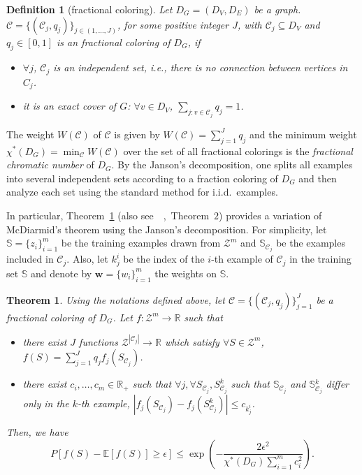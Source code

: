 \documentclass[letterpaper]{article} %
\newtheorem{theorem}{Theorem}
\newtheorem{definition}{Definition}
\newcommand{\E}{\mathbb{E}}
\newcommand{\Pro}{P}
\newcommand{\weight}{\mathbf{w}}
\newcommand{\real}{\mathbb{R}}
\newcommand{\zspace}{\mathcal{Z}}
\newcommand{\fcoloring}{\chi^*}
\newcommand{\set}[1]{\{#1\}}
\newcommand{\trainingset}{\mathbb{S}}
\newcommand{\citep}[3]{(#1\ \citeauthor{#3}\ \citeyear{#3},\ #2)}
\begin{document}
\begin{definition}[fractional coloring]
  Let $D_G=(D_V,D_E)$ be a graph. $\mathcal{C}=\set{(\mathcal{C}_j,q_j)}_{j\in (1,\dots,J)}$, for some positive integer $J$, with $\mathcal{C}_j\subseteq D_V$ and $q_j\in [0,1]$ is an fractional coloring of $D_G$, if
  \begin{itemize}
    \item $\forall j$, $\mathcal{C}_j$ is an independent set, i.e., there is no connection between vertices in $C_j$.
    \item it is an exact cover of $G$: $\forall v \in D_V$, $\sum_{j: v\in \mathcal{C}_j} q_j = 1$.
  \end{itemize}
\end{definition}
The weight $W(\mathcal{C})$ of $\mathcal{C}$ is given by $W(\mathcal{C})=\sum_{j=1}^J q_j$ and the minimum weight $\fcoloring{}(D_G)=\min_{\mathcal{C}} W(\mathcal{C})$ over the set of all fractional colorings is the \emph{fractional chromatic number} of $D_G$.
By the Janson's decomposition, one splits all examples into several independent sets according to a fraction coloring of $D_G$ and then analyze each set using the standard method for i.i.d.\ examples.

In particular, Theorem~\ref{th:fractional_mcdiarmid} \citep{also see}{Theorem~$2$}{Usunier2005} provides a variation of McDiarmid's theorem using the Janson's decomposition.
For simplicity, let $\trainingset=\set{z_i}_{i=1}^{m}$ be the training examples drawn from $\zspace^m$ and $\trainingset{}_{\mathcal{C}_j}$ be the examples included in $\mathcal{C}_j$.
Also, let $k_j^i$ be the index of the $i$-th example of $\mathcal{C}_j$ in the training set $\trainingset{}$ and denote by $\weight{}=\set{w_i}_{i=1}^m$ the weights on $\trainingset{}$.

\begin{theorem}
   \label{th:fractional_mcdiarmid}
   Using the notations defined above, let $\mathcal{C} = \set{(\mathcal{C}_j, q_j)}_{j=1}^J$ be a fractional coloring of $D_G$. Let $f:\zspace^m \to \real{}$ such that
   \begin{itemize}
     \item there exist $J$ functions $\zspace^{|\mathcal{C}_j|} \to \real{}$ which satisfy $\forall S\in \zspace^m$, $f(S)=\sum_{j=1}^J q_j f_j(S_{\mathcal{C}_j})$.
     \item there exist $c_i,\dots,c_m\in \real{}_+$ such that $\forall j,\forall S_{\mathcal{C}_j}, S_{\mathcal{C}_j}^k$ such that $\trainingset{}_{\mathcal{C}_j}$ and $\trainingset{}_{\mathcal{C}_j}^k$ differ only in the $k$-th example, $|f_j(S_{\mathcal{C}_j}) - f_j(S_{\mathcal{C}_j}^k)|\le c_{k_j^i}$.
   \end{itemize}
     Then, we have
     \[\Pro[f(S)-\E[f(S)]\ge \epsilon] \le \exp\left(-\frac{2\epsilon^2}{\fcoloring{}(D_G)\sum_{i=1}^mc_i^2}\right).\]
 \end{theorem}
\end{document}

